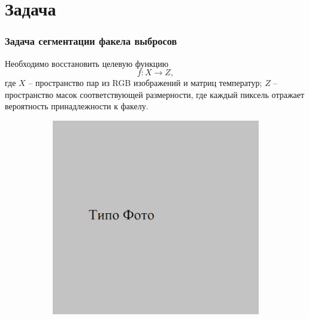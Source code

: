 \documentclass[t]{beamer}
\begin{document}
\section{Задача}

	\begin{frame}
		\frametitle{Задача сегментации факела выбросов} 
		\vspace*{-0.3cm}
		Необходимо восстановить целевую функцию
		\begin{equation}
			f: X \rightarrow Z,
			\label{eq:segment_func}
		\end{equation}
	где $X$ -- пространство пар из RGB изображений и матриц температур;
	$Z$ -- пространство масок соответствующей размерности, где каждый пиксель отражает вероятность принадлежности к факелу.
	\begin{figure}[ht!]
		\begin{subfigure}{.25\textwidth}
			\centering
			\includegraphics[width = \textwidth]{image/opt_examp}
			\caption{}
		\end{subfigure}
		\begin{subfigure}{.25\textwidth}
			\centering

\end{subfigure}
\end{figure}
\end{frame}
\end{document}
